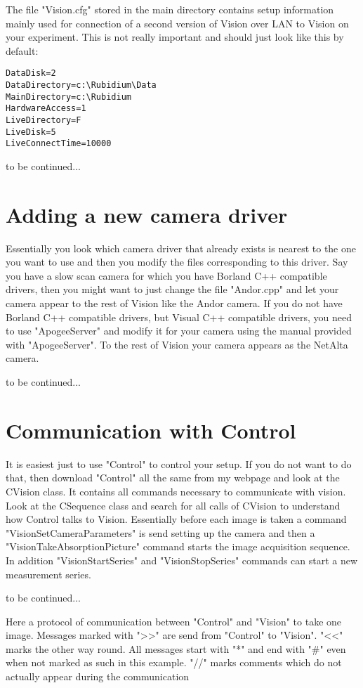 \documentclass[10pt]{article}
\begin{document}
The file "Vision.cfg" stored in the main directory contains setup
information mainly used for connection of a second version of
Vision over LAN to Vision on your experiment. This is not really
important and should just look like this by default:
\begin{verbatim}
DataDisk=2
DataDirectory=c:\Rubidium\Data
MainDirectory=c:\Rubidium
HardwareAccess=1
LiveDirectory=F
LiveDisk=5
LiveConnectTime=10000
\end{verbatim}

to be continued...

\section{Adding a new camera driver}

Essentially you look which camera driver that already exists is
nearest to the one you want to use and then you modify the files
corresponding to this driver. Say you have a slow scan camera for
which you have Borland C++ compatible drivers, then you might want
to just change the file "Andor.cpp" and let your camera appear to
the rest of Vision like the Andor camera. If you do not have
Borland C++ compatible drivers, but Visual C++ compatible drivers,
you need to use "ApogeeServer" and modify it for your camera using
the manual provided with "ApogeeServer". To the rest of Vision
your camera appears as the NetAlta camera.

to be continued...

\section{Communication with Control}

It is easiest just to use "Control" to control your setup. If you
do not want to do that, then download "Control" all the same from
my webpage and look at the CVision class. It contains all commands
necessary to communicate with vision. Look at the CSequence class
and search for all calls of CVision to understand how Control
talks to Vision. Essentially before each image is taken a command
"VisionSetCameraParameters" is send setting up the camera and then
a "VisionTakeAbsorptionPicture" command starts the image
acquisition sequence. In addition "VisionStartSeries" and
"VisionStopSeries" commands can start a new measurement series.

to be continued...

Here a protocol of communication between "Control" and "Vision" to
take one image. Messages marked with ">>" are send from "Control"
to "Vision". "<<" marks the other way round. All messages start
with "*" and end with "\#" even when not marked as such in this
example. "//" marks comments which do not actually appear during
the communication
\end{document}
